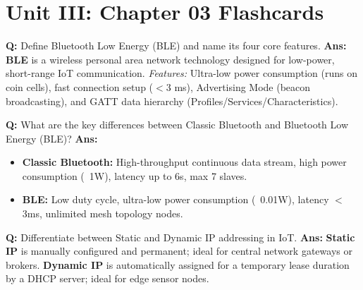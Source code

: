 \documentclass[10pt,a4paper,twocolumn]{article}
\begin{document}
\section*{Unit III: Chapter 03 Flashcards}

\begin{tcolorbox}[
  colback=white,
  colframe=UnitColorThree,
  colbacktitle=gray!10!white,
  coltitle=black,
  fonttitle=\bfseries\sffamily\small,
  title={Unit III $\bullet$ Card 1},
  boxrule=1.2pt,
  arc=2mm,
  outer arc=2mm,
  boxsep=1.5mm,
  top=1mm,
  bottom=1mm,
  left=1.5mm,
  right=1.5mm,
  before skip=2.5mm,
  after skip=2.5mm
]
\textbf{Q:} Define Bluetooth Low Energy (BLE) and name its four core features.
\tcbline
\textbf{Ans:} \textbf{BLE} is a wireless personal area network technology designed for low-power, short-range IoT communication.  
\textit{Features:} Ultra-low power consumption (runs on coin cells), fast connection setup ($<$3 ms), Advertising Mode (beacon broadcasting), and GATT data hierarchy (Profiles/Services/Characteristics).
\end{tcolorbox}


\begin{tcolorbox}[
  colback=white,
  colframe=UnitColorThree,
  colbacktitle=gray!10!white,
  coltitle=black,
  fonttitle=\bfseries\sffamily\small,
  title={Unit III $\bullet$ Card 2},
  boxrule=1.2pt,
  arc=2mm,
  outer arc=2mm,
  boxsep=1.5mm,
  top=1mm,
  bottom=1mm,
  left=1.5mm,
  right=1.5mm,
  before skip=2.5mm,
  after skip=2.5mm
]
\textbf{Q:} What are the key differences between Classic Bluetooth and Bluetooth Low Energy (BLE)?
\tcbline
\textbf{Ans:} \begin{itemize}
  \item \textbf{Classic Bluetooth:} High-throughput continuous data stream, high power consumption (~1W), latency up to 6s, max 7 slaves.
  \item \textbf{BLE:} Low duty cycle, ultra-low power consumption (~0.01W), latency $<$3ms, unlimited mesh topology nodes.
\end{itemize}
\end{tcolorbox}


\begin{tcolorbox}[
  colback=white,
  colframe=UnitColorThree,
  colbacktitle=gray!10!white,
  coltitle=black,
  fonttitle=\bfseries\sffamily\small,
  title={Unit III $\bullet$ Card 3},
  boxrule=1.2pt,
  arc=2mm,
  outer arc=2mm,
  boxsep=1.5mm,
  top=1mm,
  bottom=1mm,
  left=1.5mm,
  right=1.5mm,
  before skip=2.5mm,
  after skip=2.5mm
]
\textbf{Q:} Differentiate between Static and Dynamic IP addressing in IoT.
\tcbline
\textbf{Ans:} \textbf{Static IP} is manually configured and permanent; ideal for central network gateways or brokers. \textbf{Dynamic IP} is automatically assigned for a temporary lease duration by a DHCP server; ideal for edge sensor nodes.
\end{tcolorbox}
\end{document}

